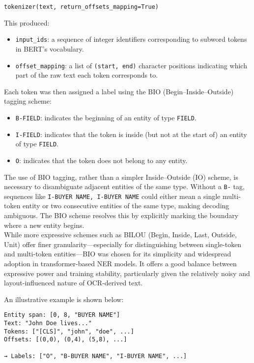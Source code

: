 \documentclass{article}
\begin{document}
\begin{verbatim}
tokenizer(text, return_offsets_mapping=True)
\end{verbatim}

This produced:
\begin{itemize}
    \item \texttt{input\_ids}: a sequence of integer identifiers corresponding to subword tokens in BERT’s vocabulary.
    \item \texttt{offset\_mapping}: a list of \texttt{(start, end)} character positions indicating which part of the raw text each token corresponds to.
\end{itemize}

Each token was then assigned a label using the BIO (Begin–Inside–Outside) tagging scheme:
\begin{itemize}
    \item \texttt{B-FIELD}: indicates the beginning of an entity of type \texttt{FIELD}.
    \item \texttt{I-FIELD}: indicates that the token is inside (but not at the start of) an entity of type \texttt{FIELD}.
    \item \texttt{O}: indicates that the token does not belong to any entity.
\end{itemize}

The use of BIO tagging, rather than a simpler Inside–Outside (IO) scheme, is necessary to disambiguate adjacent entities of the same type. Without a \texttt{B-} tag, sequences like \texttt{I-BUYER NAME, I-BUYER NAME} could either mean a single multi-token entity or two consecutive entities of the same type, making decoding ambiguous. The BIO scheme resolves this by explicitly marking the boundary where a new entity begins. \\

While more expressive schemes such as BILOU (Begin, Inside, Last, Outside, Unit) offer finer granularity—especially for distinguishing between single-token and multi-token entities—BIO was chosen for its simplicity and widespread adoption in transformer-based NER models. It offers a good balance between expressive power and training stability, particularly given the relatively noisy and layout-influenced nature of OCR-derived text.

An illustrative example is shown below:
\begin{verbatim}
Entity span: [0, 8, "BUYER NAME"]
Text: "John Doe lives..."
Tokens: ["[CLS]", "john", "doe", ...]
Offsets: [(0,0), (0,4), (5,8), ...]

→ Labels: ["O", "B-BUYER NAME", "I-BUYER NAME", ...]
\end{verbatim}
\end{document}
